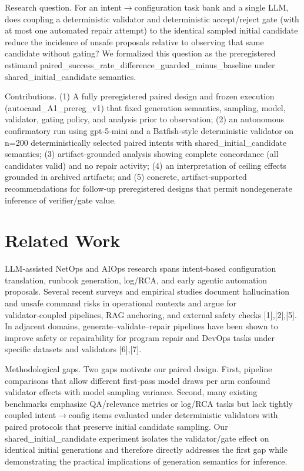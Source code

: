 \documentclass[conference]{IEEEtran}
\begin{document}
Research question. For an intent\ensuremath{\rightarrow}configuration task bank and a single LLM, does coupling a deterministic validator and deterministic accept/reject gate (with at most one automated repair attempt) to the identical sampled initial candidate reduce the incidence of unsafe proposals relative to observing that same candidate without gating? We formalized this question as the preregistered estimand paired\_success\_rate\_difference\_guarded\_minus\_baseline under shared\_initial\_candidate semantics.

Contributions. (1) A fully preregistered paired design and frozen execution (autocand\_A1\_prereg\_v1) that fixed generation semantics, sampling, model, validator, gating policy, and analysis prior to observation; (2) an autonomous confirmatory run using gpt‑5‑mini and a Batfish‑style deterministic validator on n=200 deterministically selected paired intents with shared\_initial\_candidate semantics; (3) artifact‑grounded analysis showing complete concordance (all candidates valid) and no repair activity; (4) an interpretation of ceiling effects grounded in archived artifacts; and (5) concrete, artifact‑supported recommendations for follow‑up preregistered designs that permit nondegenerate inference of verifier/gate value.

\section{Related Work}
LLM‑assisted NetOps and AIOps research spans intent‑based configuration translation, runbook generation, log/RCA, and early agentic automation proposals. Several recent surveys and empirical studies document hallucination and unsafe command risks in operational contexts and argue for validator‑coupled pipelines, RAG anchoring, and external safety checks [1],[2],[5]. In adjacent domains, generate--validate--repair pipelines have been shown to improve safety or repairability for program repair and DevOps tasks under specific datasets and validators [6],[7].

Methodological gaps. Two gaps motivate our paired design. First, pipeline comparisons that allow different first‑pass model draws per arm confound validator effects with model sampling variance. Second, many existing benchmarks emphasize QA/relevance metrics or log/RCA tasks but lack tightly coupled intent\ensuremath{\rightarrow}config items evaluated under deterministic validators with paired protocols that preserve initial candidate sampling. Our shared\_initial\_candidate experiment isolates the validator/gate effect on identical initial generations and therefore directly addresses the first gap while demonstrating the practical implications of generation semantics for inference.
\end{document}
